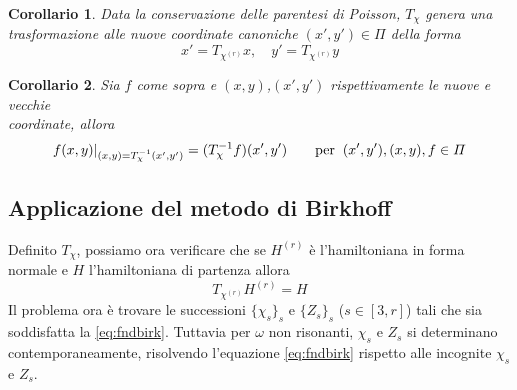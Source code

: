 \documentclass[a4paper,11pt,titlepage]{report}
\theoremstyle{definition}
\theoremstyle{plain}
\newtheorem{cor}{Corollario}
\begin{document}
\begin{cor}
 Data la conservazione delle parentesi di Poisson\cite{1977}, $T_\chi$ genera una\\     trasformazione alle nuove coordinate canoniche $(x',y') \in \varPi$ della forma
	\begin{equation}
		\label{cambiodicoor}
		x' = T_{\chi^{(r)}} x, \quad y' = T_{\chi^{(r)}} y
	\end{equation}
\end{cor}
\begin{cor}
	Sia $f$ come sopra e $(x,y)$,$(x',y')$ rispettivamente le nuove e vecchie\\ coordinate, allora
	\begin{equation}
	\label{[proprietàT]}
	f(x,y)|_{(x,y)=T_{\chi}^{-1}(x',y')} = (T_{\chi}^{-1}f)(x',y')  \qquad \hbox{per} \hspace{2mm} (x',y'),(x,y),f\in \varPi
	\end{equation}
\end{cor}		

\subsection{Applicazione del metodo di Birkhoff}
Definito $T_\chi$, possiamo ora verificare che se $H^{(r)}$ è l'hamiltoniana in forma normale e $H$ l'hamiltoniana di partenza allora 
\begin{equation}
\label{eq:fndbirk}
T_{\chi^{(r)}} H^{(r)} = H
\end{equation} 
Il problema ora è trovare le successioni $\{\chi_s\}_s$ e $\{Z_s\}_s$ ($s \in [3,r]$) tali che sia soddisfatta la \ref{eq:fndbirk}.
Tuttavia per $\omega$ non risonanti, $\chi_s$ e $Z_s$ si determinano contemporaneamente, risolvendo l'equazione \ref{eq:fndbirk} rispetto alle incognite $\chi_s$ e $Z_s$.
\end{document}
